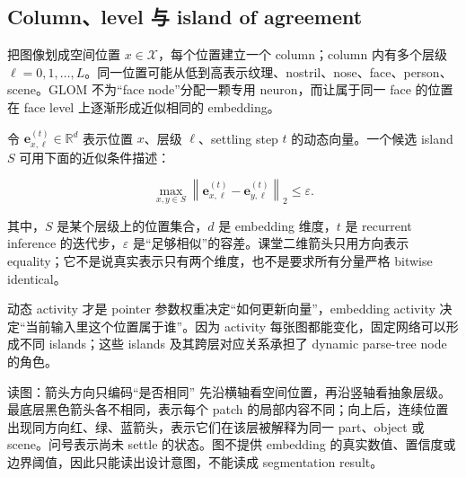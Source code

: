 \subsection{Column、level 与 island of agreement}

把图像划成空间位置 $x\in\mathcal X$，每个位置建立一个 column；column 内有多个层级 $\ell=0,1,\ldots,L$。同一位置可能从低到高表示纹理、nostril、nose、face、person、scene。GLOM 不为“face node”分配一颗专用 neuron，而让属于同一 face 的位置在 face level 上逐渐形成近似相同的 embedding。


令 $\mathbf e_{x,\ell}^{(t)}\in\mathbb R^d$ 表示位置 $x$、层级 $\ell$、settling step $t$ 的动态向量。一个候选 island $S$ 可用下面的近似条件描述：

\[
\max_{x,y\in S}\left\|\mathbf e_{x,\ell}^{(t)}-\mathbf e_{y,\ell}^{(t)}\right\|_2\le \varepsilon.
\]

其中，$S$ 是某个层级上的位置集合，$d$ 是 embedding 维度，$t$ 是 recurrent inference 的迭代步，$\varepsilon$ 是“足够相似”的容差。课堂二维箭头只用方向表示 equality；它不是说真实表示只有两个维度，也不是要求所有分量严格 bitwise identical。

\begin{importantbox}{动态 activity 才是 pointer}
参数权重决定“如何更新向量”，embedding activity 决定“当前输入里这个位置属于谁”。因为 activity 每张图都能变化，固定网络可以形成不同 islands；这些 islands 及其跨层对应关系承担了 dynamic parse-tree node 的角色。
\end{importantbox}


\begin{knowledgebox}{读图：箭头方向只编码“是否相同”}
先沿横轴看空间位置，再沿竖轴看抽象层级。最底层黑色箭头各不相同，表示每个 patch 的局部内容不同；向上后，连续位置出现同方向红、绿、蓝箭头，表示它们在该层被解释为同一 part、object 或 scene。问号表示尚未 settle 的状态。图不提供 embedding 的真实数值、置信度或边界阈值，因此只能读出设计意图，不能读成 segmentation result。
\end{knowledgebox}

